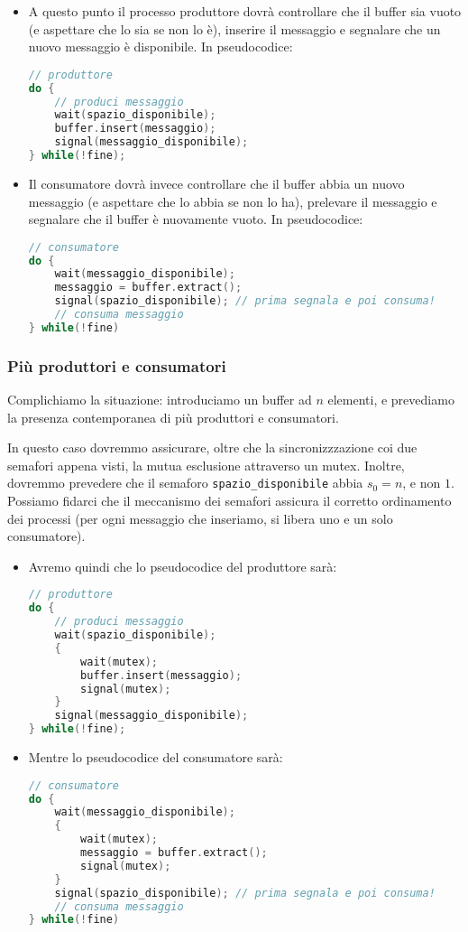 \documentclass[a4paper,11pt]{article}
\begin{document}
\begin{itemize}
	\item 
A questo punto il processo produttore dovrà controllare che il buffer sia vuoto (e aspettare che lo sia se non lo è), inserire il messaggio e segnalare che un nuovo messaggio è disponibile. In pseudocodice:
\begin{lstlisting}[language=C++, style=codestyle]	
// produttore
do {
	// produci messaggio
	wait(spazio_disponibile);
	buffer.insert(messaggio);
	signal(messaggio_disponibile);
} while(!fine);
\end{lstlisting}
	\item
Il consumatore dovrà invece controllare che il buffer abbia un nuovo messaggio (e aspettare che lo abbia se non lo ha), prelevare il messaggio e segnalare che il buffer è nuovamente vuoto. In pseudocodice:
\begin{lstlisting}[language=C++, style=codestyle]	
// consumatore
do {
	wait(messaggio_disponibile);
	messaggio = buffer.extract();
	signal(spazio_disponibile); // prima segnala e poi consuma!
	// consuma messaggio
} while(!fine)
\end{lstlisting}
\end{itemize}

\subsubsection{Più produttori e consumatori}
Complichiamo la situazione: introduciamo un buffer ad $n$ elementi, e prevediamo la presenza contemporanea di più produttori e consumatori.

In questo caso dovremmo assicurare, oltre che la sincronizzzazione coi due semafori appena visti, la mutua esclusione attraverso un mutex.
Inoltre, dovremmo prevedere che il semaforo \lstinline|spazio_disponibile| abbia $s_0 = n$, e non $1$. Possiamo fidarci che il meccanismo dei semafori assicura il corretto ordinamento dei processi (per ogni messaggio che inseriamo, si libera uno e un solo consumatore). 

\begin{itemize}
	\item 
Avremo quindi che lo pseudocodice del produttore sarà:
\begin{lstlisting}[language=C++, style=codestyle]	
// produttore
do {
	// produci messaggio
	wait(spazio_disponibile);
	{
		wait(mutex);
		buffer.insert(messaggio);
		signal(mutex);
	}
	signal(messaggio_disponibile);
} while(!fine);
\end{lstlisting}
	\item
Mentre lo pseudocodice del consumatore sarà:
\begin{lstlisting}[language=C++, style=codestyle]	
// consumatore
do {
	wait(messaggio_disponibile);
	{
		wait(mutex);
		messaggio = buffer.extract();
		signal(mutex);
	}
	signal(spazio_disponibile); // prima segnala e poi consuma!
	// consuma messaggio
} while(!fine)
\end{lstlisting}
\end{itemize}
\end{document}
